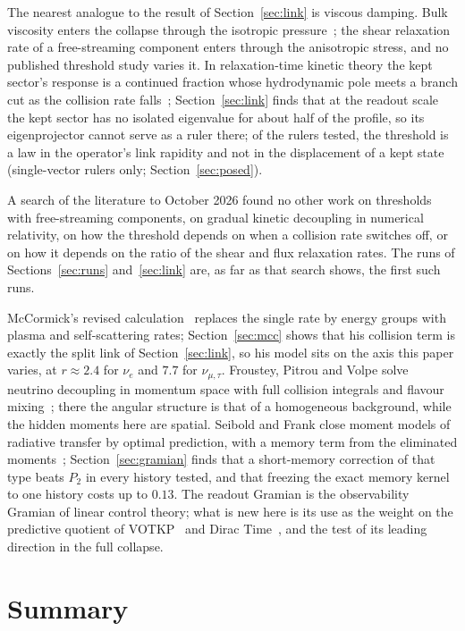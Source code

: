 \documentclass[11pt]{article}
\begin{document}
The nearest analogue to the result of Section~\ref{sec:link} is viscous damping. Bulk viscosity enters the collapse through the isotropic pressure~\cite{Yuwen}; the shear relaxation rate of a free-streaming component enters through the anisotropic stress, and no published threshold study varies it. In relaxation-time kinetic theory the kept sector's response is a continued fraction whose hydrodynamic pole meets a branch cut as the collision rate falls~\cite{Rom,Hu}; Section~\ref{sec:link} finds that at the readout scale the kept sector has no isolated eigenvalue for about half of the profile, so its eigenprojector cannot serve as a ruler there; of the rulers tested, the threshold is a law in the operator's link rapidity and not in the displacement of a kept state (single-vector rulers only; Section~\ref{sec:posed}).

A search of the literature to October 2026 found no other work on thresholds with free-streaming components, on gradual kinetic decoupling in numerical relativity, on how the threshold depends on when a collision rate switches off, or on how it depends on the ratio of the shear and flux relaxation rates. The runs of Sections~\ref{sec:runs} and~\ref{sec:link} are, as far as that search shows, the first such runs.

McCormick's revised calculation~\cite{McC2} replaces the single rate by energy groups with plasma and self-scattering rates; Section~\ref{sec:mcc} shows that his collision term is exactly the split link of Section~\ref{sec:link}, so his model sits on the axis this paper varies, at $r\approx2.4$ for $\nu_e$ and $7.7$ for $\nu_{\mu,\tau}$. Froustey, Pitrou and Volpe solve neutrino decoupling in momentum space with full collision integrals and flavour mixing~\cite{FPV}; there the angular structure is that of a homogeneous background, while the hidden moments here are spatial. Seibold and Frank close moment models of radiative transfer by optimal prediction, with a memory term from the eliminated moments~\cite{SF}; Section~\ref{sec:gramian} finds that a short-memory correction of that type beats $P_2$ in every history tested, and that freezing the exact memory kernel to one history costs up to $0.13$. The readout Gramian is the observability Gramian of linear control theory; what is new here is its use as the weight on the predictive quotient of VOTKP~\cite{VOTKP} and Dirac Time~\cite{DT}, and the test of its leading direction in the full collapse.



\section{Summary}
\end{document}
